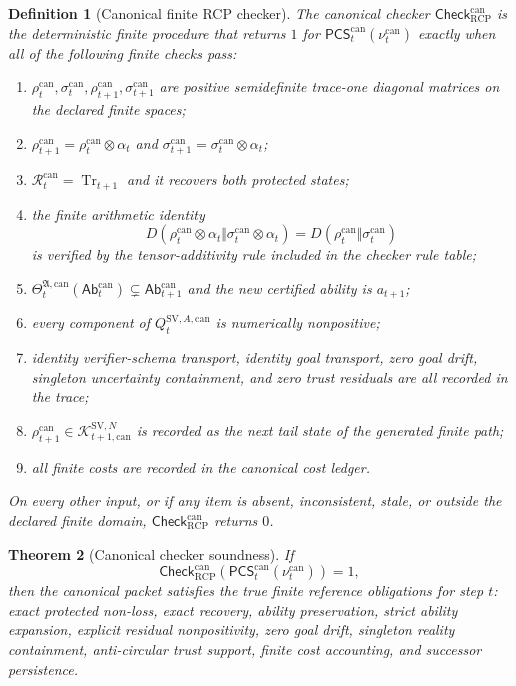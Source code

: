 \documentclass[11pt]{article}
\newtheorem{theorem}{Theorem}[section]
\newtheorem{definition}[theorem]{Definition}
\newcommand{\Tr}{\operatorname{Tr}}
\newcommand{\1}{\mathbf{1}}
\newcommand{\RCP}{\mathrm{RCP}}
\providecommand{\Kcal}{\mathcal{K}}
\begin{document}
\begin{definition}[Canonical finite RCP checker]
\label{def:batch13ra_canonical_checker}
The canonical checker \(\mathsf{Check}_{\RCP}^{\mathrm{can}}\) is the deterministic finite procedure that returns \(1\) for \(\mathsf{PCS}_t^{\mathrm{can}}(\nu_t^{\mathrm{can}})\) exactly when all of the following finite checks pass:
\begin{enumerate}[label=(\alph*),leftmargin=1.5em]
    \item \(\rho_t^{\mathrm{can}},\sigma_t^{\mathrm{can}},\rho_{t+1}^{\mathrm{can}},\sigma_{t+1}^{\mathrm{can}}\) are positive semidefinite trace-one diagonal matrices on the declared finite spaces;
    \item \(\rho_{t+1}^{\mathrm{can}}=\rho_t^{\mathrm{can}}\otimes\alpha_t\) and \(\sigma_{t+1}^{\mathrm{can}}=\sigma_t^{\mathrm{can}}\otimes\alpha_t\);
    \item \(\mathcal R_t^{\mathrm{can}}=\Tr_{t+1}\) and it recovers both protected states;
    \item the finite arithmetic identity
    \[
    D(\rho_t^{\mathrm{can}}\otimes\alpha_t\Vert\sigma_t^{\mathrm{can}}\otimes\alpha_t)
    =D(\rho_t^{\mathrm{can}}\Vert\sigma_t^{\mathrm{can}})
    \]
    is verified by the tensor-additivity rule included in the checker rule table;
    \item \(\Theta_t^{\mathfrak A,\mathrm{can}}(\mathsf{Ab}_t^{\mathrm{can}})\subsetneq\mathsf{Ab}_{t+1}^{\mathrm{can}}\) and the new certified ability is \(a_{t+1}\);
    \item every component of \(Q_t^{\mathrm{SV},A,\mathrm{can}}\) is numerically nonpositive;
    \item identity verifier-schema transport, identity goal transport, zero goal drift, singleton uncertainty containment, and zero trust residuals are all recorded in the trace;
    \item \(\rho_{t+1}^{\mathrm{can}}\in\Kcal_{t+1,\mathrm{can}}^{\mathrm{SV},N}\) is recorded as the next tail state of the generated finite path;
    \item all finite costs are recorded in the canonical cost ledger.
\end{enumerate}
On every other input, or if any item is absent, inconsistent, stale, or outside the declared finite domain, \(\mathsf{Check}_{\RCP}^{\mathrm{can}}\) returns \(0\).
\end{definition}

\begin{theorem}[Canonical checker soundness]
\label{thm:batch13ra_canonical_checker_soundness}
If
\[
\mathsf{Check}_{\RCP}^{\mathrm{can}}
(\mathsf{PCS}_t^{\mathrm{can}}(\nu_t^{\mathrm{can}}))=1,
\]
then the canonical packet satisfies the true finite reference obligations for step \(t\): exact protected non-loss, exact recovery, ability preservation, strict ability expansion, explicit residual nonpositivity, zero goal drift, singleton reality containment, anti-circular trust support, finite cost accounting, and successor persistence.
\end{theorem}
\end{document}
